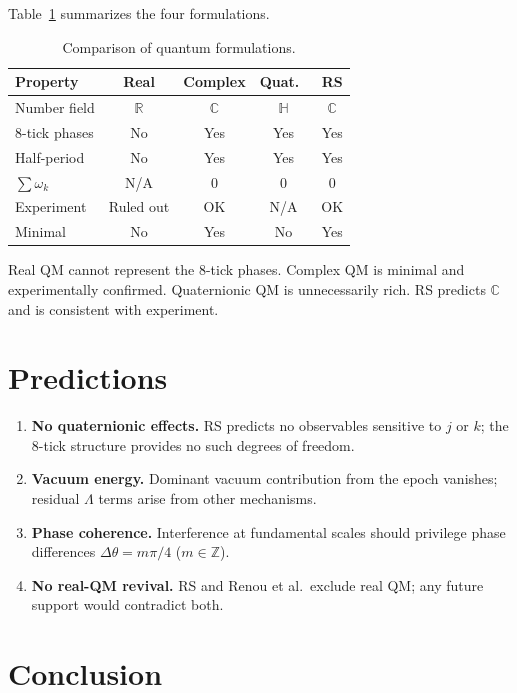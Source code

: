\documentclass[12pt,a4paper]{article}
\theoremstyle{definition}
\theoremstyle{remark}
\begin{document}
Table~\ref{tab:qm-comparison} summarizes the four formulations.

\begin{table}[htbp]
\centering
\caption{Comparison of quantum formulations.}
\label{tab:qm-comparison}
{\small
\begin{tabular}{@{}lcccc@{}}
\toprule
Property & Real & Complex & Quat.\ & RS \\
\midrule
Number field & $\mathbb{R}$ & $\mathbb{C}$ & $\mathbb{H}$ & $\mathbb{C}$ \\
8-tick phases & No & Yes & Yes & Yes \\
Half-period & No & Yes & Yes & Yes \\
$\sum \omega_k$ & N/A & 0 & 0 & 0 \\
Experiment & Ruled out & OK & N/A & OK \\
Minimal & No & Yes & No & Yes \\
\bottomrule
\end{tabular}}
\end{table}

Real QM cannot represent the 8-tick phases.  Complex QM is minimal
and experimentally confirmed.  Quaternionic QM is unnecessarily
rich.  RS predicts $\mathbb{C}$ and is consistent with experiment.

\section{Predictions}

\begin{enumerate}
\item \textbf{No quaternionic effects.}  RS predicts no observables
  sensitive to $j$ or $k$; the 8-tick structure provides no such
  degrees of freedom.
\item \textbf{Vacuum energy.}  Dominant vacuum contribution from the
  epoch vanishes; residual $\Lambda$ terms arise from other
  mechanisms.
\item \textbf{Phase coherence.}  Interference at fundamental scales
  should privilege phase differences $\Delta\theta = m\pi/4$
  ($m \in \mathbb{Z}$).
\item \textbf{No real-QM revival.}  RS and Renou et al.\ exclude
  real QM; any future support would contradict both.
\end{enumerate}

\section{Conclusion}
\end{document}
